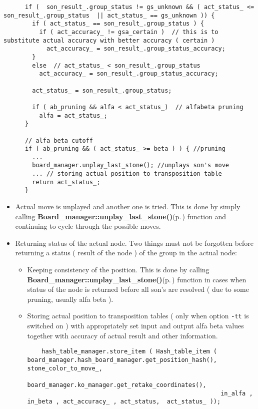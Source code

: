 \footnotesize\begin{verbatim}      if (  son_result_.group_status != gs_unknown && ( act_status_ <= son_result_.group_status  || act_status_ == gs_unknown )) {
        if ( act_status_ == son_result_.group_status ) {
          if ( act_accuracy_ != gsa_certain )  // this is to substitute actual accuracy with better accuracy ( certain )
            act_accuracy_ = son_result_.group_status_accuracy; 
        }
        else  // act_status_ < son_result_.group_status
          act_accuracy_ = son_result_.group_status_accuracy; 
      
        act_status_ = son_result_.group_status; 
            
        if ( ab_pruning && alfa < act_status_)  // alfabeta pruning
          alfa = act_status_;
      }

      // alfa beta cutoff
      if ( ab_pruning && ( act_status_ >= beta ) ) { //pruning
        ...
        board_manager.unplay_last_stone(); //unplays son's move 
        ... // storing actual position to transposition table  
        return act_status_;
      }
\end{verbatim}
\normalsize


\begin{itemize}
\item Actual move is unplayed and another one is tried. This is done by simply calling {\bf Board\_\-manager::unplay\_\-last\_\-stone()}{\rm (p.\,\pageref{classBoard__manager_a16})} function and continuing to cycle through the possible moves.\item Returning status of the actual node. Two things must not be forgotten before returning a status ( result of the node ) of the group in the actual node:\begin{itemize}
\item Keeping consistency of the position. This is done by calling {\bf Board\_\-manager::unplay\_\-last\_\-stone()}{\rm (p.\,\pageref{classBoard__manager_a16})} function in cases when status of the node is returned before all son's are resolved ( due to some pruning, usually alfa beta ).\item Storing actual position to transposition tables ( only when option {\tt -tt} is switched on ) with appropriately set input and output alfa beta values together with accuracy of actual result and other information. 

\footnotesize\begin{verbatim}    hash_table_manager.store_item ( Hash_table_item ( board_manager.hash_board_manager.get_position_hash(), stone_color_to_move_,
                                                      board_manager.ko_manager.get_retake_coordinates(),
                                                      in_alfa , in_beta , act_accuracy_ , act_status,  act_status_ )); 
\end{verbatim}
\normalsize
\end{itemize}
\end{itemize}
